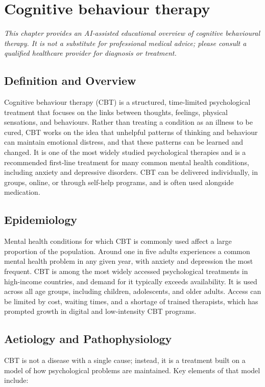 \chapter{Cognitive behaviour therapy}

\medskip
\noindent\textit{This chapter provides an AI‑assisted educational overview of cognitive behavioural therapy. It is not a substitute for professional medical advice; please consult a qualified healthcare provider for diagnosis or treatment.}

\section*{Definition and Overview}
Cognitive behaviour therapy (CBT) is a structured, time-limited psychological treatment that focuses on the links between thoughts, feelings, physical sensations, and behaviours. Rather than treating a condition as an illness to be cured, CBT works on the idea that unhelpful patterns of thinking and behaviour can maintain emotional distress, and that these patterns can be learned and changed. It is one of the most widely studied psychological therapies and is a recommended first-line treatment for many common mental health conditions, including anxiety and depressive disorders. CBT can be delivered individually, in groups, online, or through self-help programs, and is often used alongside medication.

\section*{Epidemiology}
Mental health conditions for which CBT is commonly used affect a large proportion of the population. Around one in five adults experiences a common mental health problem in any given year, with anxiety and depression the most frequent. CBT is among the most widely accessed psychological treatments in high-income countries, and demand for it typically exceeds availability. It is used across all age groups, including children, adolescents, and older adults. Access can be limited by cost, waiting times, and a shortage of trained therapists, which has prompted growth in digital and low-intensity CBT programs.

\section*{Aetiology and Pathophysiology}
CBT is not a disease with a single cause; instead, it is a treatment built on a model of how psychological problems are maintained. Key elements of that model include:

